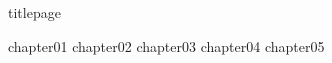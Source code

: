 \documentclass[a4paper,12pt,oneside]{book}
\begin{document}
    \frontmatter
    {titlepage}
    \tableofcontents

    \mainmatter
    {chapter01}
    {chapter02}
    {chapter03}
    {chapter04}
    {chapter05}
\end{document}
